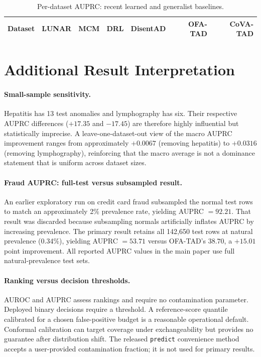 \documentclass{article}
\begin{document}
\begin{table}[h]
\centering
\caption{Per-dataset AUPRC: recent learned and generalist baselines.}
\label{tab:all-pr-2}
\small
\setlength{\tabcolsep}{4.5pt}
\begin{tabular}{lrrrrrr}
\toprule
Dataset & LUNAR & MCM & DRL & DisentAD & OFA-TAD & CoVA-TAD\\
\midrule
%
\end{tabular}
\end{table}

\section{Additional Result Interpretation}
\label{app:additional-interp}

\paragraph{Small-sample sensitivity.}
Hepatitis has 13 test anomalies and lymphography has six. Their respective AUPRC differences ($+17.35$ and $-17.45$) are therefore highly influential but statistically imprecise. A leave-one-dataset-out view of the macro AUPRC improvement ranges from approximately $+0.0067$ (removing hepatitis) to $+0.0316$ (removing lymphography), reinforcing that the macro average is not a dominance statement that is uniform across dataset sizes.

\paragraph{Fraud AUPRC: full-test versus subsampled result.}
An earlier exploratory run on credit card fraud subsampled the normal test rows to match an approximately 2\% prevalence rate, yielding AUPRC $= 92.21$. That result was discarded because subsampling normals artificially inflates AUPRC by increasing prevalence. The primary result retains all 142{,}650 test rows at natural prevalence (0.34\%), yielding AUPRC $= 53.71$ versus OFA-TAD's $38.70$, a $+15.01$ point improvement. All reported AUPRC values in the main paper use full natural-prevalence test sets.

\paragraph{Ranking versus decision thresholds.}
AUROC and AUPRC assess rankings and require no contamination parameter. Deployed binary decisions require a threshold. A reference-score quantile calibrated for a chosen false-positive budget is a reasonable operational default. Conformal calibration can target coverage under exchangeability but provides no guarantee after distribution shift. The released \texttt{predict} convenience method accepts a user-provided contamination fraction; it is not used for primary results.
\end{document}
